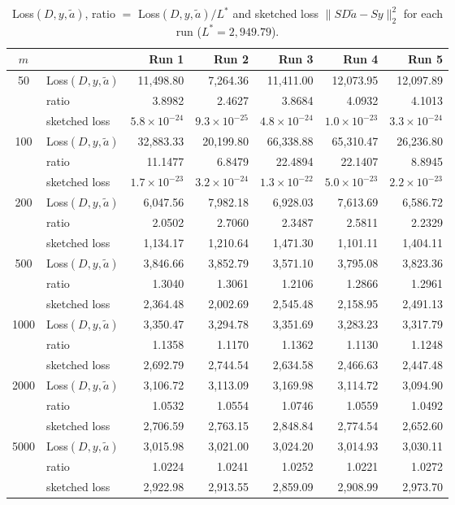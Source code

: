 \begin{table}[H]
\centering
\small
\begin{tabular}{clrrrrr}
\toprule
$m$ & & Run 1 & Run 2 & Run 3 & Run 4 & Run 5 \\
\midrule
\multirow{3}{*}{50} & Loss$(D,y,\tilde a)$ & 11{,}498.80 & 7{,}264.36 & 11{,}411.00 & 12{,}073.95 & 12{,}097.89 \\
     & ratio & 3.8982 & 2.4627 & 3.8684 & 4.0932 & 4.1013 \\
     & sketched loss & $5.8\times10^{-24}$ & $9.3\times10^{-25}$ & $4.8\times10^{-24}$ & $1.0\times10^{-23}$ & $3.3\times10^{-24}$ \\
\midrule
\multirow{3}{*}{100} & Loss$(D,y,\tilde a)$ & 32{,}883.33 & 20{,}199.80 & 66{,}338.88 & 65{,}310.47 & 26{,}236.80 \\
     & ratio & 11.1477 & 6.8479 & 22.4894 & 22.1407 & 8.8945 \\
     & sketched loss & $1.7\times10^{-23}$ & $3.2\times10^{-24}$ & $1.3\times10^{-22}$ & $5.0\times10^{-23}$ & $2.2\times10^{-23}$ \\
\midrule
\multirow{3}{*}{200} & Loss$(D,y,\tilde a)$ & 6{,}047.56 & 7{,}982.18 & 6{,}928.03 & 7{,}613.69 & 6{,}586.72 \\
     & ratio & 2.0502 & 2.7060 & 2.3487 & 2.5811 & 2.2329 \\
     & sketched loss & 1{,}134.17 & 1{,}210.64 & 1{,}471.30 & 1{,}101.11 & 1{,}404.11 \\
\midrule
\multirow{3}{*}{500} & Loss$(D,y,\tilde a)$ & 3{,}846.66 & 3{,}852.79 & 3{,}571.10 & 3{,}795.08 & 3{,}823.36 \\
     & ratio & 1.3040 & 1.3061 & 1.2106 & 1.2866 & 1.2961 \\
     & sketched loss & 2{,}364.48 & 2{,}002.69 & 2{,}545.48 & 2{,}158.95 & 2{,}491.13 \\
\midrule
\multirow{3}{*}{1000} & Loss$(D,y,\tilde a)$ & 3{,}350.47 & 3{,}294.78 & 3{,}351.69 & 3{,}283.23 & 3{,}317.79 \\
     & ratio & 1.1358 & 1.1170 & 1.1362 & 1.1130 & 1.1248 \\
     & sketched loss & 2{,}692.79 & 2{,}744.54 & 2{,}634.58 & 2{,}466.63 & 2{,}447.48 \\
\midrule
\multirow{3}{*}{2000} & Loss$(D,y,\tilde a)$ & 3{,}106.72 & 3{,}113.09 & 3{,}169.98 & 3{,}114.72 & 3{,}094.90 \\
     & ratio & 1.0532 & 1.0554 & 1.0746 & 1.0559 & 1.0492 \\
     & sketched loss & 2{,}706.59 & 2{,}763.15 & 2{,}848.84 & 2{,}774.54 & 2{,}652.60 \\
\midrule
\multirow{3}{*}{5000} & Loss$(D,y,\tilde a)$ & 3{,}015.98 & 3{,}021.00 & 3{,}024.20 & 3{,}014.93 & 3{,}030.11 \\
     & ratio & 1.0224 & 1.0241 & 1.0252 & 1.0221 & 1.0272 \\
     & sketched loss & 2{,}922.98 & 2{,}913.55 & 2{,}859.09 & 2{,}908.99 & 2{,}973.70 \\
\bottomrule
\end{tabular}
\caption{Loss$(D,y,\tilde a)$, ratio $=$ Loss$(D,y,\tilde a)/L^*$ and sketched loss $\|SD\tilde a-Sy\|_2^2$
for each run ($L^* = 2{,}949.79$).}
\end{table}

